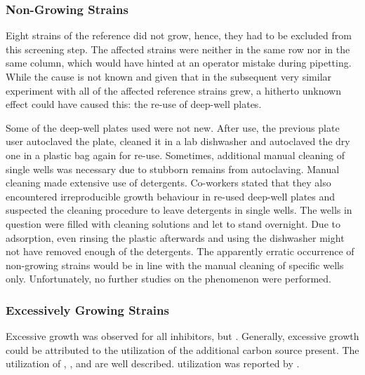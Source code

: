 \subsubsection{Non-Growing Strains}
Eight strains of the reference did not grow, hence, they had to be excluded from this screening step. The affected strains were neither in the same row nor in the same column, which would have hinted at an operator mistake during pipetting. While the cause is not known and given that in the subsequent very similar experiment with \lch{} all of the affected reference strains grew, a hitherto unknown effect could have caused this: the re-use of deep-well plates.

Some of the deep-well plates used were not new. After use, the previous plate user autoclaved the plate, cleaned it in a lab dishwasher and autoclaved the dry one in a plastic bag again for re-use. Sometimes, additional manual cleaning of single wells was necessary due to stubborn remains from autoclaving. Manual cleaning made extensive use of detergents. Co-workers stated that they also encountered irreproducible growth behaviour in re-used deep-well plates and suspected the cleaning procedure to leave detergents in single wells. The wells in question were filled with cleaning solutions and let to stand overnight. Due to adsorption, even rinsing the plastic afterwards and using the dishwasher might not have removed enough of the detergents. The apparently erratic occurrence of non-growing strains would be in line with the manual cleaning of specific wells only. Unfortunately, no further studies on the phenomenon were performed.

\subsubsection{Excessively Growing Strains}
Excessive growth was observed for all inhibitors, but \van{}. Generally, excessive growth could be attributed to the utilization of the additional carbon source present. The utilization of \fora{} \cite{Stickland1929, Quayle1972, Friedrich1979}, \acet{} \cite{Herlihy1987, Wright1966}, \fur{} \cite{Brune1983, Boopathy1993, Koopman2010, Lopez2004a, Wierckx2011} and \hmf{} \cite{Boopathy1993, Koopman2010, Lopez2004a, Wierckx2011} are well described. \Laev{} utilization was reported by \textcite{Steinbuechel1997}.

